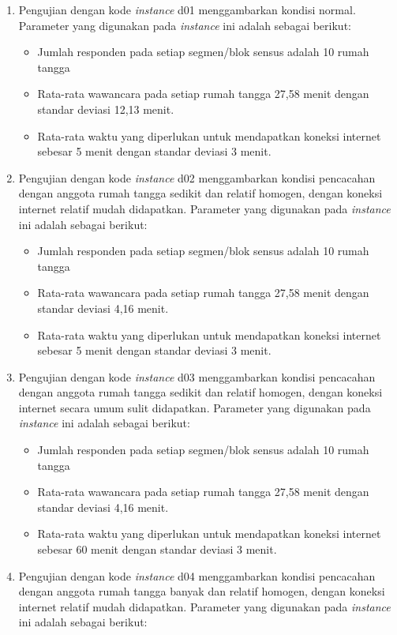 \begin{enumerate}
	\item Pengujian dengan kode \textit{instance} d01 menggambarkan kondisi normal. Parameter yang digunakan pada \textit{instance} ini adalah sebagai berikut:
	\begin{itemize}
		\item Jumlah responden pada setiap segmen/blok sensus adalah 10 rumah tangga
		\item Rata-rata wawancara pada setiap rumah tangga 27,58 menit dengan standar deviasi 12,13 menit.
		\item Rata-rata waktu yang diperlukan untuk mendapatkan koneksi internet sebesar 5 menit dengan standar deviasi 3 menit.
	\end{itemize}
	\item Pengujian dengan kode \textit{instance} d02 menggambarkan kondisi pencacahan dengan anggota rumah tangga sedikit dan relatif homogen, dengan koneksi internet relatif mudah didapatkan. Parameter yang digunakan pada \textit{instance} ini adalah sebagai berikut:
	\begin{itemize}
		\item Jumlah responden pada setiap segmen/blok sensus adalah 10 rumah tangga
		\item Rata-rata wawancara pada setiap rumah tangga 27,58 menit dengan standar deviasi 4,16 menit.
		\item Rata-rata waktu yang diperlukan untuk mendapatkan koneksi internet sebesar 5 menit dengan standar deviasi 3 menit.
	\end{itemize}
	\item Pengujian dengan kode \textit{instance} d03 menggambarkan kondisi pencacahan dengan anggota rumah tangga sedikit dan relatif homogen, dengan koneksi internet secara umum sulit didapatkan. Parameter yang digunakan pada \textit{instance} ini adalah sebagai berikut:
	\begin{itemize}
		\item Jumlah responden pada setiap segmen/blok sensus adalah 10 rumah tangga
		\item Rata-rata wawancara pada setiap rumah tangga 27,58 menit dengan standar deviasi 4,16 menit.
		\item Rata-rata waktu yang diperlukan untuk mendapatkan koneksi internet sebesar 60 menit dengan standar deviasi 3 menit.
	\end{itemize}
	\item Pengujian dengan kode \textit{instance} d04 menggambarkan kondisi pencacahan dengan anggota rumah tangga banyak dan relatif homogen, dengan koneksi internet relatif mudah didapatkan. Parameter yang digunakan pada \textit{instance} ini adalah sebagai berikut:

\end{enumerate}
